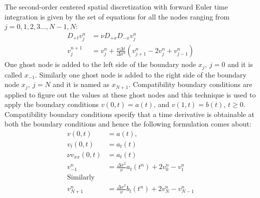 \documentclass[11pt]{article}
\begin{document}
\begin{enumerate}
The second-order centered spatial discretization with forward Euler time integration is given by the set of equations for all the nodes ranging from $j = 0,1,2,3 ..., N-1,N$:
\begin{align*}
D_{+t}v^n_j &= \nu D_{+x}D_{-x}v^n_j \\
v^{n+1}_j & = v^n_j + \frac{\nu \Delta t}{\Delta x^2}\left(v^n_{j+1} - 2v^n_j + v^n_{j-1}\right)
\end{align*}  
 One ghost node is added to the left side of the boundary node $x_j, \ j=0$ and it is called $x_{-1}$. Similarly one ghost node is added to the right side of the boundary node $x_j, \ j= N$ and it is named as $x_{N+1}$. Compatibility  boundary conditions are applied to figure out the values at these ghost nodes and this technique is used to apply the boundary conditions $v(0,t) = a(t)$, and $v(1,t) = b(t)$, $t\geq0$. 
 Compatibility boundary conditions specify that a time derivative is obtainable at both the boundary conditions and hence the following formulation comes about:
 \begin{align*}
v(0,t) & = a(t), \\
 v_t(0,t) & = a_t(t) \\
 \nu v_{xx}(0,t)&  = a_t(t) \\
 v^n_{-1} & = \frac{\Delta x^2}{\nu} a_t(t^n) + 2v^n_0 - v^n_1 \\
 \text{Similarly} & \\
 v^n_{N+1} & = \frac{\Delta x^2}{\nu} b_t(t^n) + 2v^n_{N} - v^n_{N-1}
 \end{align*}
 


\end{enumerate}
\end{document}
